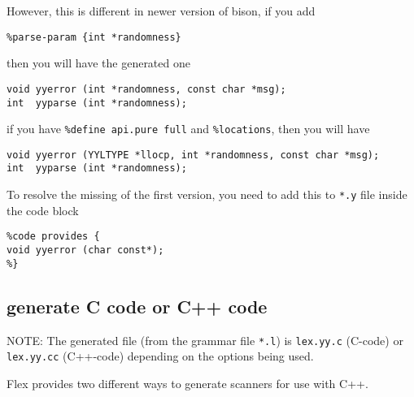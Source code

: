 However, this is different in newer version of bison, if you add
\begin{verbatim}
%parse-param {int *randomness}
\end{verbatim}
then you will have the generated one
\begin{verbatim}
void yyerror (int *randomness, const char *msg);
int  yyparse (int *randomness);
\end{verbatim}

if you have \verb!%define api.pure full! and \verb!%locations!, then you will
have
\begin{verbatim}
void yyerror (YYLTYPE *llocp, int *randomness, const char *msg);
int  yyparse (int *randomness);
\end{verbatim}

To resolve the missing of the first version, you need to add this to \verb!*.y!
file inside the code block
\begin{verbatim}
%code provides {
void yyerror (char const*);
%}
\end{verbatim}

\subsection{generate C code or C++ code}
\label{sec:lex.yy.c}
\label{sec:lex.yy.cc}

NOTE: The generated file (from the grammar file \verb!*.l!) is \verb!lex.yy.c!
(C-code) or \verb!lex.yy.cc! (C++-code) depending on the options being used.


Flex provides two different ways to generate scanners for use with C++.

